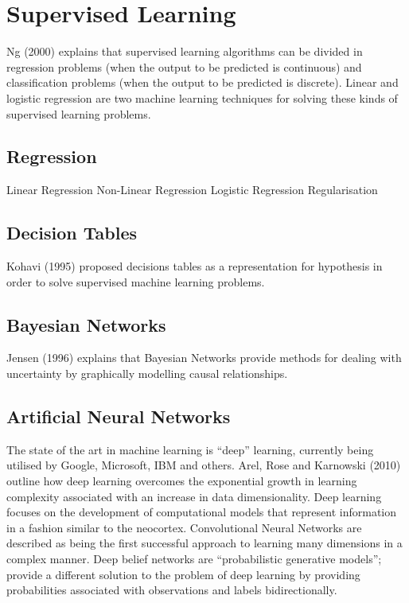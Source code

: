 \section{Supervised Learning}

Ng (2000) explains that supervised learning algorithms can be divided in regression problems (when the output to be predicted is continuous) and classification problems (when the output to be predicted is discrete). Linear and logistic regression are two machine learning techniques for solving these kinds of supervised learning problems.

\subsection{Regression}

Linear Regression
Non-Linear Regression
Logistic Regression
Regularisation

\subsection{Decision Tables}

Kohavi (1995) proposed decisions tables as a representation for hypothesis in order to solve supervised machine learning problems.

\subsection{Bayesian Networks}

Jensen (1996) explains that Bayesian Networks provide methods for dealing with uncertainty by graphically modelling causal relationships.

\subsection{Artificial Neural Networks}

The state of the art in machine learning is “deep” learning, currently being utilised by Google, Microsoft, IBM and others. Arel, Rose and Karnowski (2010) outline how deep learning overcomes the exponential growth in learning complexity associated with an increase in data dimensionality. Deep learning focuses on the development of computational models that represent information in a fashion similar to the neocortex. Convolutional Neural Networks are described as being the first successful approach to learning many dimensions in a complex manner. Deep belief networks are “probabilistic generative models”; provide a different solution to the problem of deep learning by providing probabilities associated with observations and labels bidirectionally.

